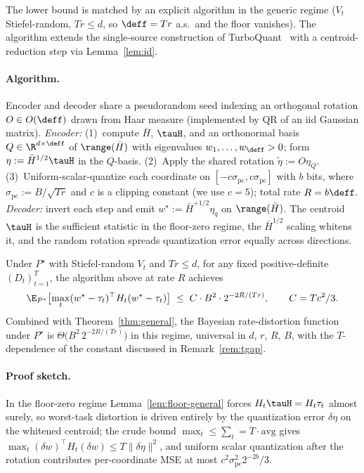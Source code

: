 The lower bound is matched by an explicit algorithm in the generic
regime ($V_t$ Stiefel-random, $Tr \leq d$, so $\deff = Tr$ a.s.\ and
the floor vanishes). The algorithm extends the single-source
construction of TurboQuant~\citep{zandieh2025turboquant} with a
centroid-reduction step via Lemma~\ref{lem:id}.

\paragraph{Algorithm.}\label{subsec:alg}\label{subsec:rd-encoder-impl}
Encoder and decoder share a pseudorandom seed indexing an orthogonal
rotation $O \in O(\deff)$ drawn from Haar measure (implemented by QR of
an iid Gaussian matrix). \emph{Encoder:} (1)~compute $\bar H$, $\tauH$,
and an orthonormal basis $Q \in \R^{d\times\deff}$ of $\range(\bar H)$
with eigenvalues $w_1,\ldots,w_{\deff} > 0$; form $\eta := \bar
H^{1/2}\tauH$ in the $Q$-basis. (2)~Apply the shared rotation
$\tilde\eta := O\eta_Q$. (3)~Uniform-scalar-quantize each coordinate on
$[-c\sigma_{\mathrm{pc}}, c\sigma_{\mathrm{pc}}]$ with $b$ bits, where
$\sigma_{\mathrm{pc}} := B/\sqrt{Tr}$ and $c$ is a clipping constant
(we use $c = 5$); total rate $R = b\deff$. \emph{Decoder:} invert each
step and emit $w^\star := \bar H^{+1/2}\eta_q$ on $\range(\bar H)$. The
centroid $\tauH$ is the sufficient statistic in the floor-zero regime,
the $\bar H^{1/2}$ scaling whitens it, and the random rotation spreads
quantization error equally across directions.

\begin{theorem}\label{thm:achv}
Under $P^\star$ with Stiefel-random $V_t$ and $Tr\leq d$, for any fixed
positive-definite $(D_t)_{t=1}^T$, the algorithm above at rate $R$
achieves
\begin{equation}\label{eq:thm-ub}
  \E_{P^\star}\bigl[\max_t(w^\star-\tau_t)^\top H_t(w^\star-
  \tau_t)\bigr]
  \;\leq\; C\cdot B^2 \cdot 2^{-2R/(Tr)},
  \qquad C = Tc^2/3.
\end{equation}
Combined with Theorem~\ref{thm:general}, the Bayesian rate-distortion
function under $P^\star$ is $\Theta\bigl(B^2\, 2^{-2R/(Tr)}\bigr)$ in
this regime, universal in $d$, $r$, $R$, $B$, with the
$T$-dependence of the constant discussed in Remark~\ref{rem:tgap}.
\end{theorem}

\paragraph{Proof sketch.} In the floor-zero regime
Lemma~\ref{lem:floor-general} forces $H_t\tauH = H_t\tau_t$ almost
surely, so worst-task distortion is driven entirely by the quantization
error $\delta\eta$ on the whitened centroid; the crude bound
$\max_t \leq \sum_t = T\cdot\mathrm{avg}$ gives
$\max_t(\delta w)^\top H_t(\delta w) \leq T\|\delta\eta\|^2$, and
uniform scalar quantization after the rotation contributes
per-coordinate MSE at most $c^2\sigma_{\mathrm{pc}}^2 2^{-2b}/3$.

